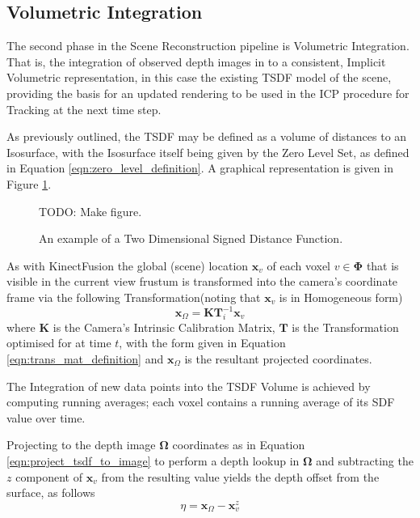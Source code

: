 \subsection{Volumetric Integration}
\label{subsec:moseg_static_integration}
The second phase in the Scene Reconstruction pipeline is Volumetric Integration.
That is, the integration of observed depth images in to a consistent, Implicit
Volumetric representation, in this case the existing TSDF model of the scene,
providing the basis for an updated rendering to be used in the ICP procedure
for Tracking at the next time step.

As previously outlined, the TSDF may be defined as a volume of distances to an
Isosurface, with the Isosurface itself being given by the Zero Level Set, as
defined in Equation \ref{eqn:zero_level_definition}. A graphical representation
is given in Figure \ref{fig:sdf_example}.
\begin{figure}[ht]
  \label{fig:sdf_example}
  \centering
  TODO: Make figure.
  \caption{An example of a Two Dimensional Signed Distance Function.}
\end{figure}

As with KinectFusion \cite{Newcombe2011} the global (scene) location
$\mathbf{x}_{v}$ of each voxel $v \in \mathbf{\Phi}$ that is visible in the
current view frustum is transformed into the camera's coordinate frame via the
following Transformation(noting that $\mathbf{x}_{v}$ is in Homogeneous form)
\begin{equation}
\label{eqn:project_tsdf_to_image}
\mathbf{x}_{\Omega} = \mathbf{K}\mathbf{T}_i^{-1}\mathbf{x}_{v}
\end{equation}
where $\mathbf{K}$ is the Camera's Intrinsic Calibration Matrix, $\mathbf{T}$ is
the Transformation optimised for at time $t$, with the form given in Equation
\ref{eqn:trans_mat_definition} and $\mathbf{x}_{\Omega}$ is the resultant
projected coordinates.

The Integration of new data points into the TSDF Volume is achieved by computing 
running averages; each voxel contains a running average of its SDF value over
time.

Projecting to the depth image $\mathbf{\Omega}$ coordinates as in Equation
\ref{eqn:project_tsdf_to_image} to perform a depth lookup in $\mathbf{\Omega}$
and subtracting the $z$ component of $\mathbf{x}_{v}$ from the resulting value
yields the depth offset from the surface, as follows
\begin{equation}
  \label{eqn:integration_offset}
  \eta = \mathbf{x}_{\Omega} - \mathbf{x}_{v}^{z}
\end{equation}

